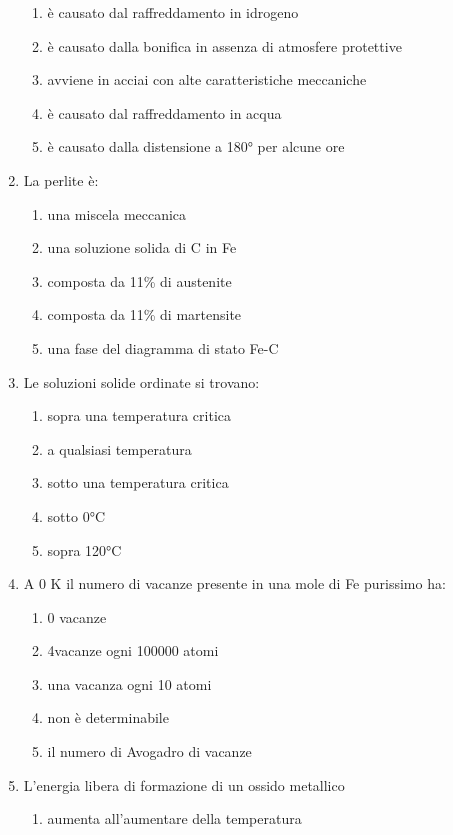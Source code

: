 \begin{enumerate}
\begin{enumerate}
        \item è causato dal raffreddamento in idrogeno
        \item è causato dalla bonifica in assenza di atmosfere protettive
        \item avviene in acciai con alte caratteristiche meccaniche
        \item è causato dal raffreddamento in acqua
        \item è causato dalla distensione a 180° per alcune ore
    \end{enumerate}
    \item La perlite è:
    \begin{enumerate}
        \item una miscela meccanica
        \item una soluzione solida di C in Fe
        \item composta da 11\% di austenite
        \item composta da 11\% di martensite
        \item una fase del diagramma di stato Fe-C
    \end{enumerate}
    \item Le soluzioni solide ordinate si trovano:
    \begin{enumerate}
        \item  sopra una temperatura critica
        \item a qualsiasi temperatura
        \item  sotto una temperatura critica
        \item sotto 0°C
        \item sopra 120°C
    \end{enumerate}
    \item A 0 K il numero di vacanze presente in una mole di Fe purissimo ha:
    \begin{enumerate}
        \item 0 vacanze 
        \item 4vacanze ogni 100000 atomi
        \item una vacanza ogni 10 atomi
        \item non è determinabile
        \item il numero di Avogadro di vacanze
    \end{enumerate}
    \item L’energia libera di formazione di un ossido metallico
    \begin{enumerate}
        \item aumenta all’aumentare della temperatura

\end{enumerate}
\end{enumerate}
